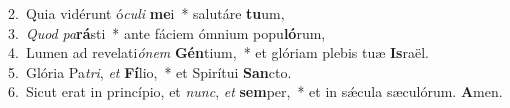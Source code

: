 {2.~}Quia vidérunt ó\textit{cu}\textit{li} \textbf{me}i~* salutáre \textbf{tu}um,\\
{3.~}\textit{Quod} \textit{pa}\textbf{rá}sti~* ante fáciem ómnium popu\textbf{ló}rum,\\
{4.~}Lumen ad revelati\textit{ó}\textit{nem} \textbf{Gén}tium,~* et glóriam plebis tuæ \textbf{Is}raël.\\
{5.~}Glória Pa\textit{tri}, \textit{et} \textbf{Fí}lio,~* et Spirítui \textbf{San}cto.\\
{6.~}Sicut erat in princípio, et \textit{nunc}, \textit{et} \textbf{sem}per,~* et in sǽcula sæculórum. \textbf{A}men.\\
